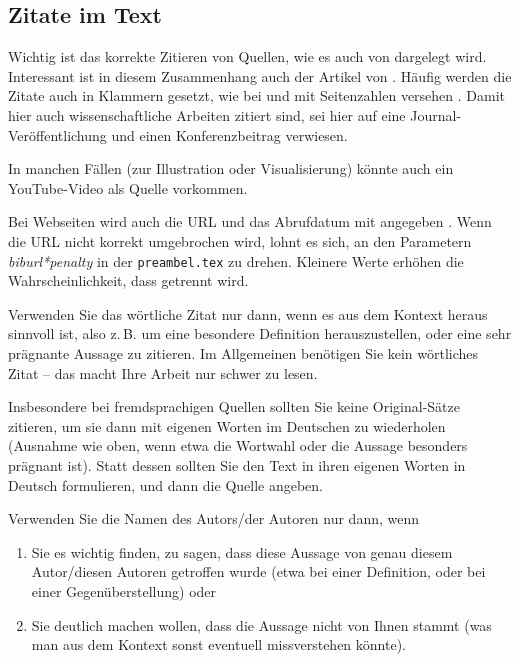 \documentclass[conference,compsoc,final,a4paper]{IEEEtran}
\begin{document}
\subsection{Zitate im Text}
Wichtig ist das korrekte Zitieren von Quellen, wie es auch von \cite{Kornmeier2011} dargelegt wird. Interessant ist in diesem Zusammenhang auch der Artikel von \cite{Kramer2009}. Häufig werden die Zitate auch in Klammern gesetzt, wie bei \parencite{Kornmeier2011} und mit Seitenzahlen versehen \parencite[S. 22--24]{Kornmeier2011}.
Damit hier auch wissenschaftliche Arbeiten zitiert sind, sei hier auf eine Journal-Veröffentlichung \cite{Christidis2016} und einen Konferenzbeitrag \cite{Redmon2016} verwiesen.

In manchen Fällen (zur Illustration oder Visualisierung) könnte auch ein YouTube-Video\autocite{gronkh2019} als Quelle vorkommen.

Bei Webseiten wird auch die URL und das Abrufdatum mit angegeben \parencite{Gao2017}. Wenn die URL nicht korrekt umgebrochen wird, lohnt es sich, an den Parametern \textit{biburl*penalty} in der \texttt{preambel.tex} zu drehen. Kleinere Werte erhöhen die Wahrscheinlichkeit, dass getrennt wird.

Verwenden Sie das wörtliche Zitat nur dann, wenn es aus dem Kontext heraus sinnvoll ist, also z.\,B. um eine besondere Definition herauszustellen, oder eine sehr prägnante Aussage zu zitieren. Im Allgemeinen benötigen Sie kein wörtliches Zitat -- das macht Ihre Arbeit nur schwer zu lesen.

Insbesondere bei fremdsprachigen Quellen sollten Sie keine Original-Sätze zitieren, um sie dann mit eigenen Worten im Deutschen zu wiederholen (Ausnahme wie oben, wenn etwa die Wortwahl oder die Aussage besonders prägnant ist). Statt dessen sollten Sie den Text in ihren eigenen Worten in Deutsch formulieren, und dann die Quelle angeben.

Verwenden Sie die Namen des Autors/der Autoren nur dann, wenn

\begin{enumerate}
\item Sie es wichtig finden, zu sagen, dass diese Aussage von genau diesem Autor/diesen Autoren getroffen wurde (etwa bei einer Definition, oder bei einer Gegenüberstellung) oder
\item Sie deutlich machen wollen, dass die Aussage nicht von Ihnen stammt (was man aus dem Kontext sonst eventuell missverstehen könnte).
\end{enumerate}
\end{document}
